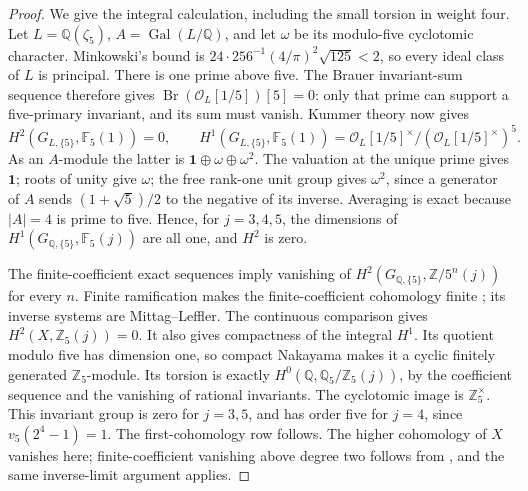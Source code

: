 \begin{proof}
We give the integral calculation, including the small torsion in
weight four. Let \(L=\mathbb Q(\zeta_5)\),
\(A=\operatorname{Gal}(L/\mathbb Q)\), and let \(\omega\) be its
modulo-five cyclotomic character. Minkowski's bound is
\(24\cdot256^{-1}(4/\pi)^2\sqrt{125}<2\), so every ideal class
of \(L\) is principal. There is one prime above five. The
Brauer invariant-sum sequence therefore gives
\(\operatorname{Br}(\mathcal O_L[1/5])[5]=0\): only that prime
can support a five-primary invariant, and its sum must vanish.
Kummer theory now gives
\[
H^2(G_{L,\{5\}},\mathbb F_5(1))=0,\qquad
H^1(G_{L,\{5\}},\mathbb F_5(1))=
\mathcal O_L[1/5]^\times/(\mathcal O_L[1/5]^\times)^5.
\]
As an \(A\)-module the latter is
\(\mathbf1\oplus\omega\oplus\omega^2\). The valuation at the
unique prime gives \(\mathbf1\); roots of unity give \(\omega\);
the free rank-one unit group gives \(\omega^2\), since a generator
of \(A\) sends \((1+\sqrt5)/2\) to the negative of its inverse.
Averaging is exact because \(|A|=4\) is prime to five. Hence, for
\(j=3,4,5\), the dimensions of \(H^1(G_{\mathbb Q,\{5\}},
\mathbb F_5(j))\) are all one, and \(H^2\) is zero.

The finite-coefficient exact sequences imply vanishing of
\(H^2(G_{\mathbb Q,\{5\}},\mathbb Z/5^n(j))\) for every \(n\).
Finite ramification makes the finite-coefficient cohomology finite
\cite[I, Corollary 4.15]{DE_MilneADT}; its inverse systems are
Mittag--Leffler. The continuous comparison
\cite[Proposition 1.6 and Theorem 2.2]{DE_Jannsen1988} gives
\(H^2(X,\mathbb Z_5(j))=0\). It also gives compactness of the
integral \(H^1\). Its quotient modulo five has dimension one, so
compact Nakayama makes it a cyclic finitely generated
\(\mathbb Z_5\)-module. Its torsion is exactly
\(H^0(\mathbb Q,\mathbb Q_5/\mathbb Z_5(j))\), by the coefficient
sequence and the vanishing of rational invariants. The cyclotomic
image is \(\mathbb Z_5^\times\). This invariant group is zero for
\(j=3,5\), and has order five for \(j=4\), since
\(v_5(2^4-1)=1\). The first-cohomology row follows. The
higher cohomology of \(X\) vanishes here; finite-coefficient
vanishing above degree two follows from
\cite[I, Theorem 4.10(c)]{DE_MilneADT}, and the same inverse-limit
argument applies.


\end{proof}
